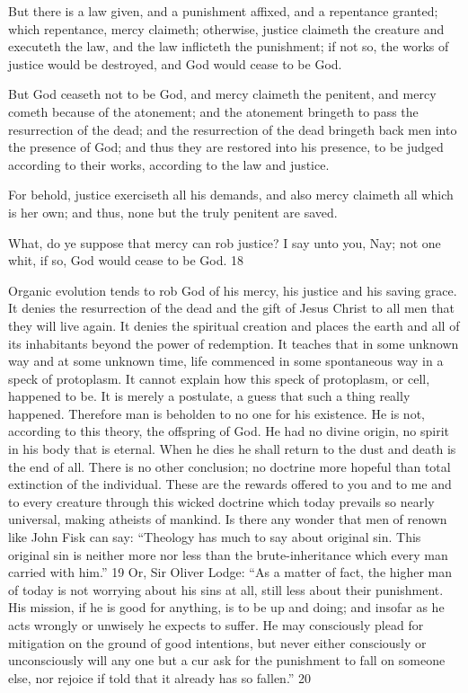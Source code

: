 But there is a law given, and a punishment affixed, and a repentance granted; which
repentance, mercy claimeth; otherwise, justice claimeth the creature and executeth the law,
and the law inflicteth the punishment; if not so, the works of justice would be destroyed, and
God would cease to be God.

But God ceaseth not to be God, and mercy claimeth the penitent, and mercy cometh because
of the atonement; and the atonement bringeth to pass the resurrection of the dead; and the
resurrection of the dead bringeth back men into the presence of God; and thus they are
restored into his presence, to be judged according to their works, according to the law and
justice.

For behold, justice exerciseth all his demands, and also mercy claimeth all which is her own;
and thus, none but the truly penitent are saved.

What, do ye suppose that mercy can rob justice? I say unto you, Nay; not one whit, if so, God
would cease to be God. 18

Organic evolution tends to rob God of his mercy, his justice and his saving grace. It denies
the resurrection of the dead and the gift of Jesus Christ to all men that they will live again. It
denies the spiritual creation and places the earth and all of its inhabitants beyond the power
of redemption. It teaches that in some unknown way and at some unknown time, life
commenced in some spontaneous way in a speck of protoplasm. It cannot explain how this
speck of protoplasm, or cell, happened to be. It is merely a postulate, a guess that such a
thing really happened. Therefore man is beholden to no one for his existence. He is not,
according to this theory, the offspring of God. He had no divine origin, no spirit in his body
that is eternal. When he dies he shall return to the dust and death is the end of all. There is no
other conclusion; no doctrine more hopeful than total extinction of the individual. These are
the rewards offered to you and to me and to every creature through this wicked doctrine
which today prevails so nearly universal, making atheists of mankind. Is there any wonder
that men of renown like John Fisk can say: ``Theology has much to say about original sin.
This original sin is neither more nor less than the brute-inheritance which every man carried
with him.'' 19 Or, Sir Oliver Lodge: ``As a matter of fact, the higher man of today is not
worrying about his sins at all, still less about their punishment. His mission, if he is good for
anything, is to be up and doing; and insofar as he acts wrongly or unwisely he expects to
suffer. He may consciously plead for mitigation on the ground of good intentions, but never
either consciously or unconsciously will any one but a cur ask for the punishment to fall on
someone else, nor rejoice if told that it already has so fallen.'' 20

